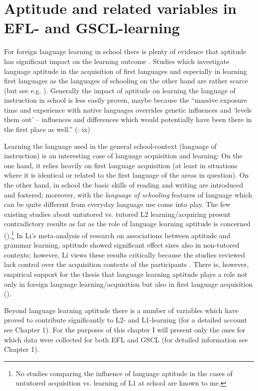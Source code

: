 \documentclass[output=paper]{langsci/langscibook}
\begin{document}
\section{Aptitude and related variables in EFL- and GSCL-learning}\label{sec:09:2}

For foreign language learning in school there is plenty of evidence that aptitude has significant impact on the learning outcome \citep{Li2015}. Studies which investigate language aptitude in the acquisition of first languages and especially in learning first languages as the languages of schooling on the other hand are rather scarce (but see e.g. \citealt{SkehanDucroquet1988}). Generally the impact of aptitude on learning the language of instruction in school is less easily proven, maybe because the “massive exposure time and experience with native languages overrides genetic influences and ‘levels them out' – influences and differences which would potentially have been there in the first place as well.” (\citealt{Reiterer2018}: ix)

Learning the language used in the general school-context (language of instruction) is an interesting case of language acquisition and learning: On the one hand, it relies heavily on first language acquisition (at least in situations where it is identical or related to the first language of the areas in question). On the other hand, in school the basic skills of reading and writing are introduced and fostered; moreover, with the \textit{language of schooling} \citep{Schleppegrell2004} features of language which can be quite different from everyday language use come into play. The few existing studies about untutored vs. tutored L2 learning/acquiring present contradictory results as far as the role of language learning aptitude is concerned (\citealt{UdryEtAl2019}).\footnote{No studies comparing the influence of language aptitude in the cases of untutored acquisition vs. learning of L1 at school are known to me.} In Li’s meta-analysis of research on associations between aptitude and grammar learning, aptitude showed significant effect sizes also in non-tutored contexts; however, Li views these results critically because the studies reviewed lack control over the acquisition contexts of the participants \citep[405]{Li2015}. There is, however, empirical support for the thesis that language learning aptitude plays a role not only in foreign language learning/acquisition but also in first language acquisition (\citealt{BiedronPawlak2016}).

Beyond language learning aptitude there is a number of variables which have proved to contribute significantly to L2- and L1-learning (for a detailed account see Chapter 1). For the purposes of this chapter I will present only the ones for which data were collected for both EFL and GSCL (for detailed information see Chapter 1).
\end{document}

